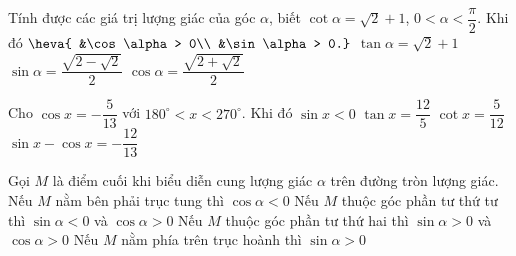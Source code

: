 \begin{ex}%
	Tính được các giá trị  lượng giác của góc $\alpha$, biết $\cot \alpha=\sqrt{2}+1$, $0< \alpha < \dfrac{\pi}{2}$. Khi đó
	 \choiceTF
		{\True 
		$\heva{ 
		&\cos  \alpha > 0\\
		 &\sin \alpha > 0.}$}
		 {$\tan \alpha=\sqrt{2}+1$}
		 {\True
		 $\sin \alpha=\dfrac{\sqrt{2-\sqrt{2}}}{2}$}
		{\True $\cos  \alpha=\dfrac{\sqrt{2+\sqrt{2}}}{2}$}
\end{ex}

\begin{ex}%
	Cho $\cos x=-\dfrac{5}{13} $ với $180^\circ  <x<270^\circ $. Khi đó
	 \choiceTF
		{\True $\sin x<0$} 
		{\True $\tan x=\dfrac{12}{5} $} 
		{\True  $\cot x=\dfrac{5}{12} $}
		 {$\sin x-\cos x=-\dfrac{12}{13} $}
\end{ex}

\begin{ex}%
	Gọi $M$  là điểm cuối khi biểu diễn cung lượng giác $\alpha $ trên đường tròn lượng giác.
	 \choiceTF
		{Nếu $M$ nằm  bên phải trục tung thì $\cos \alpha <0$}
		{\True Nếu $M$ thuộc góc phần tư thứ tư thì $\sin \alpha <0$  và $\cos \alpha >0$}
		{Nếu $M$ thuộc góc phần tư thứ hai thì $\sin \alpha >0$ và $\cos  \alpha >0$}
		{\True Nếu $M$ nằm phía trên  trục hoành thì $\sin \alpha >0$}
\end{ex}

